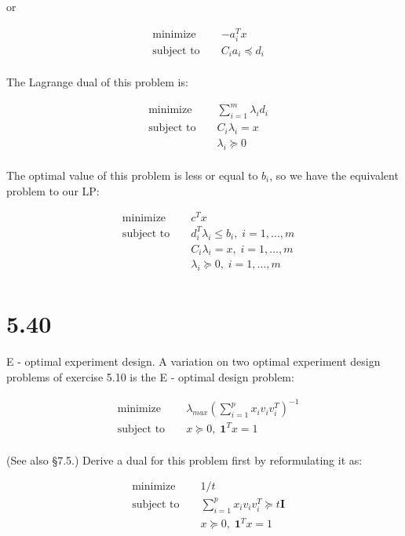 \documentclass{article}
\begin{document}
or 

\begin{align*}
&\text{minimize } && - a_i^T x \\
&\text{subject to } &&C_i a_i \preceq d_i \\
\end{align*} 

The Lagrange dual of this problem is:

\begin{align*}
&\text{minimize } && \sum_{i = 1}^{m} \lambda_i d_i \\
&\text{subject to } 
&& C_i \lambda_i = x \\
& &&\lambda_i \succeq 0\\
\end{align*} 

The optimal value of this problem is less or equal to $b_i$, so we have the equivalent problem to our LP:

\begin{align*}
&\text{minimize } && c^T x \\
&\text{subject to } &&d_i^T \lambda_i \leq b_i,
\; i = 1, ... , m\\
& && C_i \lambda_i = x, \; i = 1, ... , m\\
& && \lambda_i \succeq 0, \; i = 1, ... , m\\
\end{align*} 

\section*{5.40}
 
E - optimal experiment design. A variation on two optimal experiment design problems of exercise 5.10
is the E - optimal design problem:

\begin{align*}
&\text{minimize } && \lambda_{max}
(\sum_{i = 1}^p x_i v_i v_i^T)^{-1} \\
&\text{subject to } 
&&x \succeq 0, \; \boldsymbol{1}^T x = 1\\
\end{align*} 

(See also \S 7.5.) Derive a dual for this problem first by reformulating it as: 
 
\begin{align*}
&\text{minimize } && 1 / t \\
&\text{subject to } 
&& \sum_{i = 1}^p x_i v_i v_i^T
\succeq t \boldsymbol{I} \\
& &&x \succeq 0, \; \boldsymbol{1}^T x = 1
\end{align*} 
\end{document}
